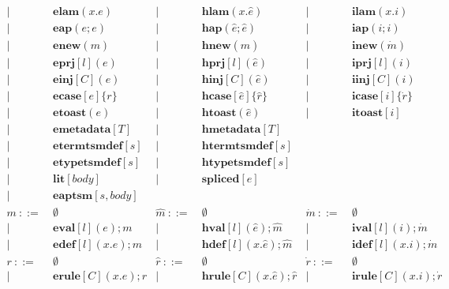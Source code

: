 \documentclass[letterpaper, notitlepage]{article}
\begin{document}
\[\begin{array}{rlrlrl}
				| ~ &~ \mathbf{elam}(x.e)     			& 		 	| ~ &~ 	\mathbf{hlam}(x.\hat{e})				& 		 	| ~ &~	\mathbf{ilam}(x.i)\\
				| ~ &~ \mathbf{eap}(e;e)     			& 		 	| ~ &~ 	\mathbf{hap}(\hat{e};\hat{e})			& 		 	| ~ &~	\mathbf{iap}(i;i)\\
				| ~ &~ \mathbf{enew}(m)     			& 		 	| ~ &~	\mathbf{hnew}(\hat{m})					& 		 	| ~ &~	\mathbf{inew}(\dot{m})\\
				| ~ &~ \mathbf{eprj}[l](e)     			& 		 	| ~ &~	\mathbf{hprj}[l](\hat{e})				& 		 	| ~ &~	\mathbf{iprj}[l](i)\\
				| ~ &~ \mathbf{einj}[C](e)     			& 		 	| ~ &~	\mathbf{hinj}[C](\hat{e})				& 		 	| ~ &~	\mathbf{iinj}[C](i)\\
				| ~ &~ \mathbf{ecase}[e]\{r\}     		& 		 	| ~ &~	\mathbf{hcase}[\hat{e}]\{\hat{r}\}		& 		 	| ~ &~	\mathbf{icase}[i]\{\dot{r}\}\\
				| ~ &~ \mathbf{etoast}(e)     			& 		 	| ~ &~	\mathbf{htoast}(\hat{e})				& 		 	| ~ &~	\mathbf{itoast}[i]\\
				| ~ &~ \mathbf{emetadata}[T]     		& 		 	| ~ &~	\mathbf{hmetadata}[T]\\
				| ~ &~ \mathbf{etermtsmdef}[s]     		&			| ~ &~ 	\mathbf{htermtsmdef}[s]\\
				| ~ &~ \mathbf{etypetsmdef}[s]			& 			| ~ &~ 	\mathbf{htypetsmdef}[s]\\
				| ~ &~ \mathbf{lit}[body]				& 		 	| ~ &~ 	\mathbf{spliced}[e]\\
				| ~ &~ \mathbf{eaptsm}[s,body]\\
	m 			~::=&~ \emptyset						&\hat{m}	~::=&~ \emptyset								&\dot{m}	~::=&~ \emptyset\\
				| ~ &~ \mathbf{eval}[l](e);m 			&			| ~ &~ \mathbf{hval}[l](\hat{e});\hat{m} 		&			| ~ &~ \mathbf{ival}[l](i);\dot{m}\\
				| ~ &~ \mathbf{edef}[l](x.e);m 			&			| ~ &~ \mathbf{hdef}[l](x.\hat{e});\hat{m}		&			| ~ &~ \mathbf{idef}[l](x.i);\dot{m}\\
	r 			~::=&~ \emptyset 						&\hat{r} 	~::=&~ \emptyset 								&\dot{r} 	~::=&~ \emptyset\\
				| ~ &~ \mathbf{erule}[C](x.e);r 		& 			| ~ &~ \mathbf{hrule}[C](x.\hat{e});\hat{r} 	&			| ~ &~ \mathbf{irule}[C](x.i);\dot{r}
\end{array}
\]
\end{document}
